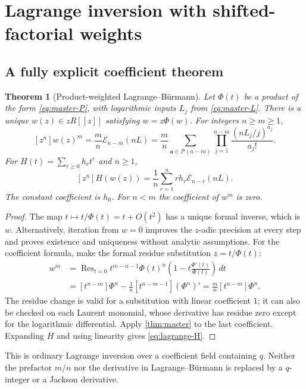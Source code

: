 \documentclass[11pt,a4paper]{article}
\numberwithin{equation}{section}
\newtheorem{theorem}{Theorem}[section]
\theoremstyle{definition}
\theoremstyle{remark}
\newcommand{\Ecal}{\mathcal E}
\newcommand{\Pcal}{\mathcal P}
\newcommand{\Res}{\mathop{\mathrm{Res}}}
\begin{document}
\section{Lagrange inversion with shifted-factorial weights}\label{sec:lagrange}

\subsection{A fully explicit coefficient theorem}
\begin{theorem}[Product-weighted Lagrange--B\"urmann]\label{thm:lagrange}
Let $\Phi(t)$ be a product of the form \eqref{eq:master-P}, with logarithmic
inputs $L_j$ from \eqref{eq:master-L}. There is a unique $w(z)\in zR[[z]]$
satisfying $w=z\Phi(w)$. For integers $n\ge m\ge1$,
\begin{equation}\label{eq:lagrange-master}
 [z^n]w(z)^m
 =\frac mn\Ecal_{n-m}(nL)
 =\frac mn\sum_{\bm a\in\Pcal(n-m)}\prod_{j=1}^{n-m}
                      \frac{(nL_j/j)^{a_j}}{a_j!}.
\end{equation}
For $H(t)=\sum_{r\ge0}h_rt^r$ and $n\ge1$,
\begin{equation}\label{eq:lagrange-H}
 [z^n]H(w(z))=\frac1n\sum_{r=1}^n r h_r\Ecal_{n-r}(nL).
\end{equation}
The constant coefficient is $h_0$. For $n<m$ the coefficient of $w^m$ is zero.
\end{theorem}
\begin{proof}
The map $t\mapsto t/\Phi(t)=t+O(t^2)$ has a unique formal inverse, which is
$w$. Alternatively, iteration from $w=0$ improves the $z$-adic precision at every
step and proves existence and uniqueness without analytic assumptions.
For the coefficient formula, make the formal residue substitution
$z=t/\Phi(t)$:
\begin{align*}
 [z^n]w^m
 &=\Res_{t=0}t^{m-n-1}\Phi(t)^n
              \left(1-t\frac{\Phi'(t)}{\Phi(t)}\right)\,dt\\
 &=[t^{n-m}]\Phi^n-\frac1n[t^{n-m-1}](\Phi^n)'
   =\frac mn[t^{n-m}]\Phi^n.
\end{align*}
The residue change is valid for a substitution with linear coefficient $1$;
it can also be checked on each Laurent monomial, whose derivative has residue
zero except for the logarithmic differential. Apply \cref{thm:master} to the last
coefficient. Expanding $H$ and using linearity gives \eqref{eq:lagrange-H}.
\end{proof}
This is ordinary Lagrange inversion over a coefficient field containing $q$.
Neither the prefactor $m/n$ nor the derivative in Lagrange--B\"urmann is replaced
by a $q$-integer or a Jackson derivative.
\end{document}
